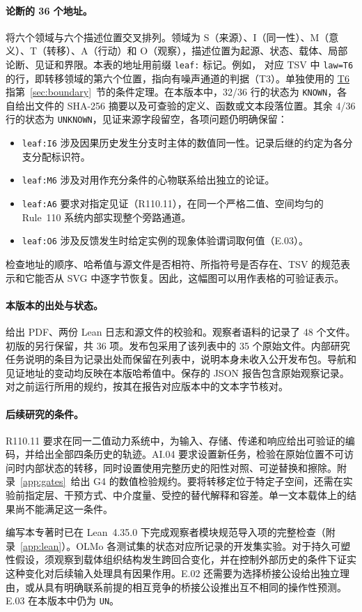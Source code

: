 \paragraph{论断的 36 个地址。}
将六个领域与六个描述位置交叉排列。领域为 S（来源）、I（同一性）、M（意义）、T（转移）、A（行动）和 O（观察），描述位置为起源、状态、载体、局部论断、见证和界限。本表的地址用前缀 \texttt{leaf:} 标记。例如， 对应 TSV 中 \texttt{law=T6} 的行，即转移领域的第六个位置，指向有噪声通道的判据（T3）。单独使用的 \hyperref[thm:conditional-bridge]{T6} 指第~\ref{sec:boundary}~节的条件定理。在本版本中，32/36 行的状态为 \texttt{KNOWN}，各自给出文件的 SHA-256 摘要以及可查验的定义、函数或文本段落位置。其余 4/36 行的状态为 \texttt{UNKNOWN}，见证来源字段留空，各项问题仍明确保留：
\begin{itemize}
\item \texttt{leaf:I6} 涉及因果历史发生分支时主体的数值同一性。记录后继的约定为各分支分配标识符。
\item \texttt{leaf:M6} 涉及对用作充分条件的心物联系给出独立的论证。
\item \texttt{leaf:A6} 要求对指定见证（R110.11），在同一个严格二值、空间均匀的 Rule~110 系统内部实现整个旁路通道。
\item \texttt{leaf:O6} 涉及反馈发生时给定实例的现象体验谓词取何值（E.03）。
\end{itemize}
检查地址的顺序、哈希值与源文件是否相符、所指符号是否存在、TSV 的规范表示和它能否从 SVG 中逐字节恢复。因此，这幅图可以用作表格的可验证表示。

\paragraph{本版本的出处与状态。}
给出 PDF、两份 Lean 日志和源文件的校验和。观察者语料的记录了 48 个文件。初版的另行保留，共 36 项。发布包采用了该列表中的 35 个原始文件。内部研究任务说明的条目为记录出处而保留在列表中，说明本身未收入公开发布包。导航和见证地址的变动均反映在本版哈希值中。保存的 JSON 报告包含原始观察记录。对之前运行所用的规约，按其在报告对应版本中的文本字节核对。

\paragraph{后续研究的条件。}
R110.11 要求在同一二值动力系统中，为输入、存储、传递和响应给出可验证的编码，并给出全部四条历史的轨迹。AI.04 要求设置新任务，检验在原始位置不可访问时内部状态的转移，同时设置使用完整历史的阳性对照、可逆替换和擦除。附录~\ref{app:gates}~给出 G4 的数值检验规约。要将转移定位于特定子空间，还需在实验前指定层、干预方式、中介度量、受控的替代解释和容差。单一文本载体上的结果尚不能满足这一条件。

编写本专著时已在 Lean~4.35.0 下完成观察者模块规范导入项的完整检查（附录~\ref{app:lean}）。OLMo 各测试集的状态对应所记录的开发集实验。对于持久可塑性假设，须观察到载体组织结构发生跨回合变化，并在控制外部历史的条件下证实这种变化对后续输入处理具有因果作用。E.02 还需要为选择桥接公设给出独立理由，或从具有明确联系前提的相互竞争的桥接公设推出互不相同的操作性预测。E.03 在本版本中仍为 \texttt{UN}。
